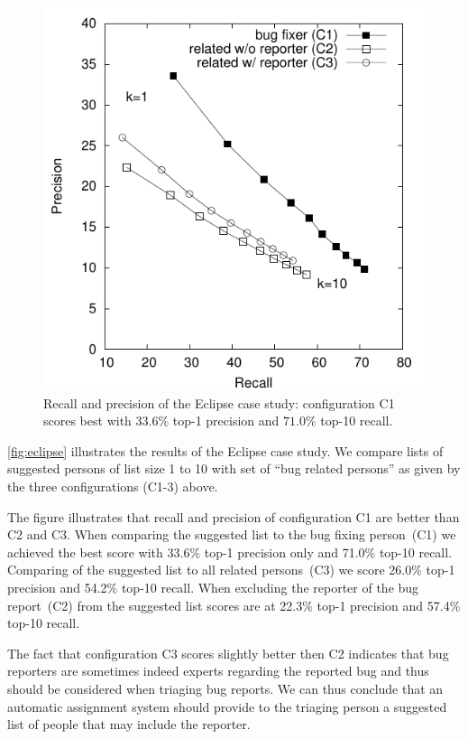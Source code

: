 \begin{figure}
    \includegraphics[width=\linewidth]{fig/devlect-test-set}
    \caption{Recall and precision of the Eclipse case study: configuration C1 scores best with $33.6\%$ top-1 precision and $71.0\%$ top-10 recall.}
    \label{fig:eclipse}
\end{figure} 

\autoref{fig:eclipse} illustrates the results of the Eclipse case study. We compare lists of suggested persons of list size 1 to 10 with set of ``bug related persons'' as given by the three configurations (C1-3) above.

The figure illustrates that recall and precision of configuration C1 are better than C2 and C3. When comparing the suggested list to the bug fixing person~(C1) we achieved the best score with 33.6\% top-1 precision only and 71.0\% top-10 recall. Comparing of the suggested list to all related persons~(C3) we score 26.0\% top-1 precision and 54.2\% top-10 recall. When excluding the reporter of the bug report~(C2) from the suggested list scores are at 22.3\% top-1 precision and 57.4\% top-10 recall.

The fact that configuration C3 scores slightly better then C2 indicates that bug reporters are sometimes indeed experts regarding the reported bug and thus should be considered when triaging bug reports. We can thus conclude that an automatic assignment system should provide to the triaging person a suggested list of people that may include the reporter.

